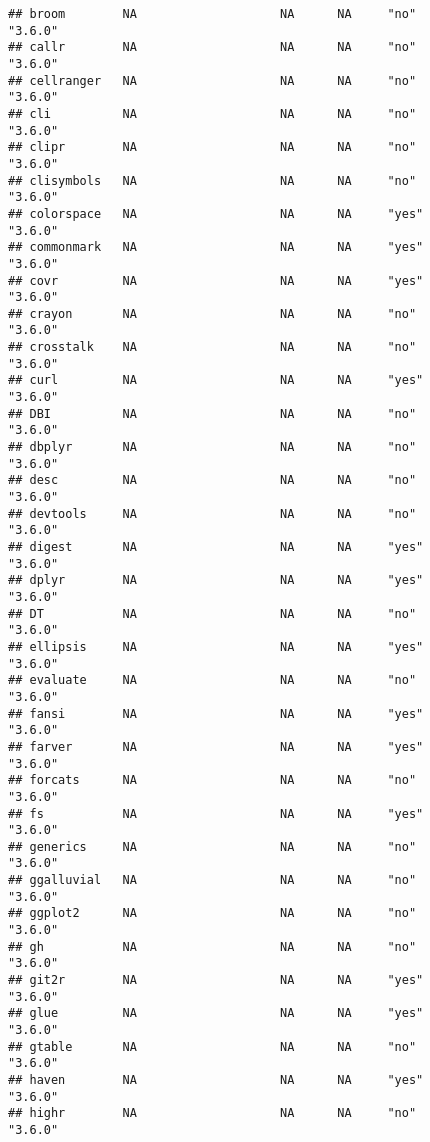 \documentclass[]{book}
\begin{document}
\begin{verbatim}
## broom        NA                    NA      NA     "no"             "3.6.0"
## callr        NA                    NA      NA     "no"             "3.6.0"
## cellranger   NA                    NA      NA     "no"             "3.6.0"
## cli          NA                    NA      NA     "no"             "3.6.0"
## clipr        NA                    NA      NA     "no"             "3.6.0"
## clisymbols   NA                    NA      NA     "no"             "3.6.0"
## colorspace   NA                    NA      NA     "yes"            "3.6.0"
## commonmark   NA                    NA      NA     "yes"            "3.6.0"
## covr         NA                    NA      NA     "yes"            "3.6.0"
## crayon       NA                    NA      NA     "no"             "3.6.0"
## crosstalk    NA                    NA      NA     "no"             "3.6.0"
## curl         NA                    NA      NA     "yes"            "3.6.0"
## DBI          NA                    NA      NA     "no"             "3.6.0"
## dbplyr       NA                    NA      NA     "no"             "3.6.0"
## desc         NA                    NA      NA     "no"             "3.6.0"
## devtools     NA                    NA      NA     "no"             "3.6.0"
## digest       NA                    NA      NA     "yes"            "3.6.0"
## dplyr        NA                    NA      NA     "yes"            "3.6.0"
## DT           NA                    NA      NA     "no"             "3.6.0"
## ellipsis     NA                    NA      NA     "yes"            "3.6.0"
## evaluate     NA                    NA      NA     "no"             "3.6.0"
## fansi        NA                    NA      NA     "yes"            "3.6.0"
## farver       NA                    NA      NA     "yes"            "3.6.0"
## forcats      NA                    NA      NA     "no"             "3.6.0"
## fs           NA                    NA      NA     "yes"            "3.6.0"
## generics     NA                    NA      NA     "no"             "3.6.0"
## ggalluvial   NA                    NA      NA     "no"             "3.6.0"
## ggplot2      NA                    NA      NA     "no"             "3.6.0"
## gh           NA                    NA      NA     "no"             "3.6.0"
## git2r        NA                    NA      NA     "yes"            "3.6.0"
## glue         NA                    NA      NA     "yes"            "3.6.0"
## gtable       NA                    NA      NA     "no"             "3.6.0"
## haven        NA                    NA      NA     "yes"            "3.6.0"
## highr        NA                    NA      NA     "no"             "3.6.0"

\end{verbatim}
\end{document}
